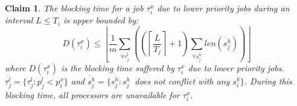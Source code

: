 \documentclass[12pt,english]{report}
\newtheorem{clm}{Claim}
\begin{document}
\begin{clm}\label{delay}
The blocking time for a job $\tau_{i}^{x}$ due to lower priority jobs 
during an interval $L\le T_{i}$ is upper bounded by:
\begin{equation}
D(\tau_{i}^{x})\le\left\lfloor \frac{1}{m}\sum_{\forall\bar{\tau_{j}^{l}}}\left(\left(\left\lceil \frac{L}{T_{j}}\right\rceil +1\right)\sum_{\forall\ddot{s_{j}^{h}}}len\left(\ddot{s_{j}^{h}}\right)\right)\right\rfloor \label{PNF-delay}
\end{equation}
where $D(\tau_{i}^{x})$ is the blocking time 
suffered by $\tau_{i}^{x}$
due to lower priority jobs. $\bar{\tau_{j}^{l}}=\{\tau_{j}^{l}:p_{j}^{l}<p_{i}^{x}\}$
and $\ddot{s_{j}^{h}}=\{s_{j}^{h}:s_{j}^{h}\,$ \textit{does not conflict with any} $s_{i}^{k}\}$.
During this blocking time, all processors are unavailable for $\tau_{i}^{x}$.
\end{clm}
\end{document}
